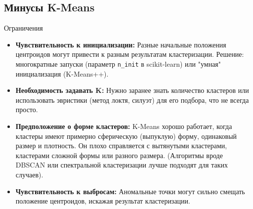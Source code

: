 \subsection{Минусы K-Means}
\begin{alerttextbox}{Ограничения}
    \begin{itemize}
        \item \textbf{Чувствительность к инициализации:} Разные начальные положения центроидов могут привести к разным результатам кластеризации. Решение: многократные запуски (параметр \texttt{n\_init} в scikit-learn) или "умная" инициализация (K-Means++). %
        \item \textbf{Необходимость задавать K:} Нужно заранее знать количество кластеров или использовать эвристики (метод локтя, силуэт) для его подбора, что не всегда просто.
        \item \textbf{Предположение о форме кластеров:} K-Means хорошо работает, когда кластеры имеют примерно сферическую (выпуклую) форму, одинаковый размер и плотность. Он плохо справляется с вытянутыми кластерами, кластерами сложной формы или разного размера. (Алгоритмы вроде DBSCAN или спектральной кластеризации лучше подходят для таких случаев).
        \item \textbf{Чувствительность к выбросам:} Аномальные точки могут сильно смещать положение центроидов, искажая результат кластеризации.
    \end{itemize}
\end{alerttextbox}

